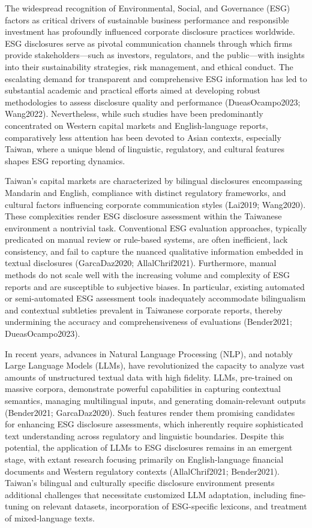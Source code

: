 \documentclass[
  12pt,
]{article}
\begin{document}
The widespread recognition of Environmental, Social, and Governance
(ESG) factors as critical drivers of sustainable business performance
and responsible investment has profoundly influenced corporate
disclosure practices worldwide. ESG disclosures serve as pivotal
communication channels through which firms provide stakeholders---such
as investors, regulators, and the public---with insights into their
sustainability strategies, risk management, and ethical conduct. The
escalating demand for transparent and comprehensive ESG information has
led to substantial academic and practical efforts aimed at developing
robust methodologies to assess disclosure quality and performance
(DueasOcampo2023; Wang2022). Nevertheless, while such studies have been
predominantly concentrated on Western capital markets and
English-language reports, comparatively less attention has been devoted
to Asian contexts, especially Taiwan, where a unique blend of
linguistic, regulatory, and cultural features shapes ESG reporting
dynamics.

Taiwan's capital markets are characterized by bilingual disclosures
encompassing Mandarin and English, compliance with distinct regulatory
frameworks, and cultural factors influencing corporate communication
styles (Lai2019; Wang2020). These complexities render ESG disclosure
assessment within the Taiwanese environment a nontrivial task.
Conventional ESG evaluation approaches, typically predicated on manual
review or rule-based systems, are often inefficient, lack consistency,
and fail to capture the nuanced qualitative information embedded in
textual disclosures (GarcaDaz2020; AllalChrif2021). Furthermore, manual
methods do not scale well with the increasing volume and complexity of
ESG reports and are susceptible to subjective biases. In particular,
existing automated or semi-automated ESG assessment tools inadequately
accommodate bilingualism and contextual subtleties prevalent in
Taiwanese corporate reports, thereby undermining the accuracy and
comprehensiveness of evaluations (Bender2021; DueasOcampo2023).

In recent years, advances in Natural Language Processing (NLP), and
notably Large Language Models (LLMs), have revolutionized the capacity
to analyze vast amounts of unstructured textual data with high fidelity.
LLMs, pre-trained on massive corpora, demonstrate powerful capabilities
in capturing contextual semantics, managing multilingual inputs, and
generating domain-relevant outputs (Bender2021; GarcaDaz2020). Such
features render them promising candidates for enhancing ESG disclosure
assessments, which inherently require sophisticated text understanding
across regulatory and linguistic boundaries. Despite this potential, the
application of LLMs to ESG disclosures remains in an emergent stage,
with extant research focusing primarily on English-language financial
documents and Western regulatory contexts (AllalChrif2021; Bender2021).
Taiwan's bilingual and culturally specific disclosure environment
presents additional challenges that necessitate customized LLM
adaptation, including fine-tuning on relevant datasets, incorporation of
ESG-specific lexicons, and treatment of mixed-language texts.
\end{document}
